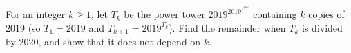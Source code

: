 For an integer $k\ge1$, let $T_k$ be the power tower $2019^{2019^{\cdot^{\cdot^{2019}}}}$ containing $k$ copies of $2019$ (so $T_1=2019$ and $T_{k+1}=2019^{T_k}$). Find the remainder when $T_k$ is divided by $2020$, and show that it does not depend on $k$.

